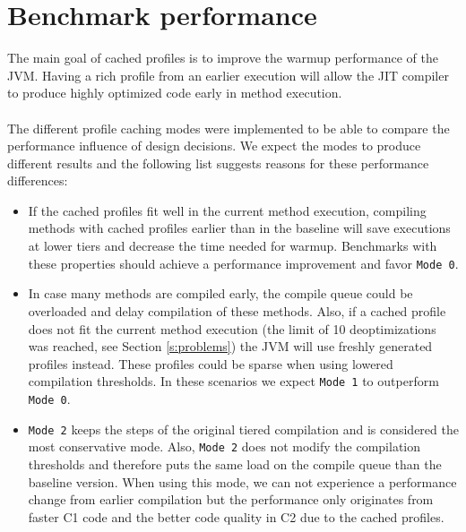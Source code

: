 \section{Benchmark performance}
\label{s:perf_benchmark}
The main goal of cached profiles is to improve the warmup performance of the JVM. Having a rich profile from an earlier execution will allow the JIT compiler to produce highly optimized code early in method execution.
\\\\
The different profile caching modes were implemented to be able to compare the performance influence of design decisions. We expect the modes to produce different results and the following list suggests reasons for these performance differences:
\begin{itemize}
  \item If the cached profiles fit well in the current method execution, compiling methods with cached profiles earlier than in the baseline will save executions at lower tiers and decrease the time needed for warmup. Benchmarks with these properties should achieve a performance improvement and favor \texttt{Mode 0}.
  \item In case many methods are compiled early, the compile queue could be overloaded and delay compilation of these methods. Also, if a cached profile does not fit the current method execution (the limit of 10 deoptimizations was reached, see Section \ref{s:problems}) the JVM will use freshly generated profiles instead. These profiles could be sparse when using lowered compilation thresholds. In these scenarios we expect \texttt{Mode 1} to outperform \texttt{Mode 0}.
  \item \texttt{Mode 2} keeps the steps of the original tiered compilation and is considered the most conservative mode. Also, \texttt{Mode 2} does not modify the compilation thresholds and therefore puts the same load on the compile queue than the baseline version. When using this mode, we can not experience a performance change from earlier compilation but the performance only originates from faster C1 code and the better code quality in C2 due to the cached profiles.
\end{itemize}
